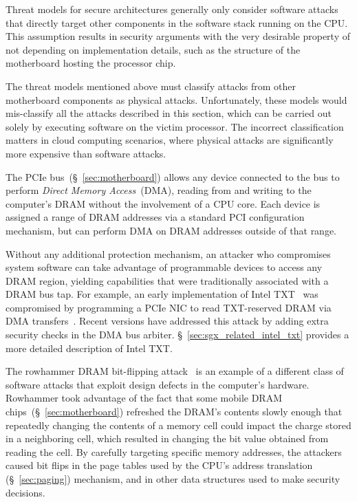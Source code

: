 \label{sec:device_attacks}

Threat models for secure architectures generally only consider software attacks
that directly target other components in the software stack running on the CPU.
This assumption results in security arguments with the very desirable property
of not depending on implementation details, such as the structure of the
motherboard hosting the processor chip.

The threat models mentioned above must classify attacks from other motherboard
components as physical attacks. Unfortunately, these models would mis-classify
all the attacks described in this section, which can be carried out solely by
executing software on the victim processor. The incorrect classification
matters in cloud computing scenarios, where physical attacks are significantly
more expensive than software attacks.


\label{sec:pcie_attacks}

The PCIe bus~(\S~\ref{sec:motherboard}) allows any device connected to the bus
to perform \textit{Direct Memory Access}~(DMA), reading from and writing to
the computer's DRAM without the involvement of a CPU core. Each device is
assigned a range of DRAM addresses via a standard PCI configuration mechanism,
but can perform DMA on DRAM addresses outside of that range.

Without any additional protection mechanism, an attacker who compromises system
software can take advantage of programmable devices to access any DRAM region,
yielding capabilities that were traditionally associated with a DRAM bus tap.
For example, an early implementation of Intel TXT~\cite{grawrock2009txt} was
compromised by programming a PCIe NIC to read TXT-reserved DRAM via DMA
transfers~\cite{wojtczuk2011txt}. Recent versions have addressed this attack by
adding extra security checks in the DMA bus arbiter.
\S~\ref{sec:sgx_related_intel_txt} provides a more detailed description of
Intel TXT.


\label{sec:rowhammer_attack}

The rowhammer DRAM bit-flipping attack~\cite{kim2014rowhammer,
google2015rowhammer, gruss2015rowhammer} is an example of a different class of
software attacks that exploit design defects in the computer's hardware.
Rowhammer took advantage of the fact that some mobile DRAM
chips~(\S~\ref{sec:motherboard}) refreshed the DRAM's contents slowly enough
that repeatedly changing the contents of a memory cell could impact the charge
stored in a neighboring cell, which resulted in changing the bit value obtained
from reading the cell. By carefully targeting specific memory addresses, the
attackers caused bit flips in the page tables used by the CPU's address
translation (\S~\ref{sec:paging}) mechanism, and in other data structures used
to make security decisions.


